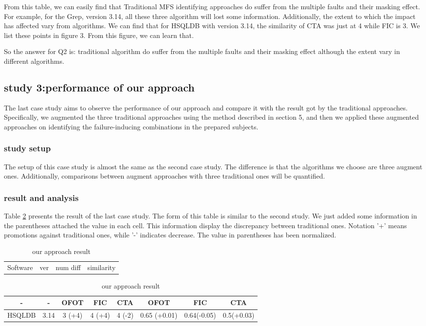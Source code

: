 \documentclass{sig-alternate}
\begin{document}
From this table, we can easily find that Traditional MFS identifying approaches do suffer from the multiple faults and their masking effect. For example, for the Grep, version 3.14, all these three algorithm will lost some information. Additionally, the extent to which the impact has affected vary from algorithms. We can find that for HSQLDB with version 3.14, the similarity of CTA was just at 4 while FIC is 3. We list these points in figure 3. From this figure, we can learn that.

So the answer for Q2 is: traditional algorithm do suffer from the multiple faults and their masking effect although the extent vary in different algorithms.

\subsection{study 3:performance of our approach}
The last case study aims to observe the performance of our approach and compare it with the result got by the traditional approaches. Specifically, we augmented the three traditional approaches using the method described in section 5, and then we applied these augmented approaches on identifying the failure-inducing combinations in the prepared subjects.

\subsubsection{study setup}
The setup of this case study is almost the same as the second case study. The difference is that the algorithms we choose are three augment ones. Additionally, comparisons between augment approaches with three traditional ones will be quantified. 

\subsubsection{result and analysis}
Table \ref{our_result} presents the result of the last case study. The form of this table is similar to the second study. We just added some information in the parentheses attached the value in each cell. This information display the  discrepancy between traditional ones. Notation '+' means promotions against traditional ones, while '-' indicates decrease. The value in parentheses has been normalized. 

\begin{table}\renewcommand{\arraystretch}{1.3}
\caption{our approach result}
\label{our_result}
\begin{tabular}{p{}|p{}|p{}|p{}} \hline
   Software & ver  &  num diff & similarity
\end{tabular}

\begin{tabular}{c|c|c|c|c|c|c|c} \hline
- & - & OFOT & FIC & CTA & OFOT & FIC & CTA  \\ \hline
HSQLDB & 3.14 & 3 (+4)& 4 (+4)& 4 (-2)& 0.65 (+0.01)& 0.64(-0.05)&  0.5(+0.03) \\
\hline\end{tabular}
\end{table}
\end{document}
